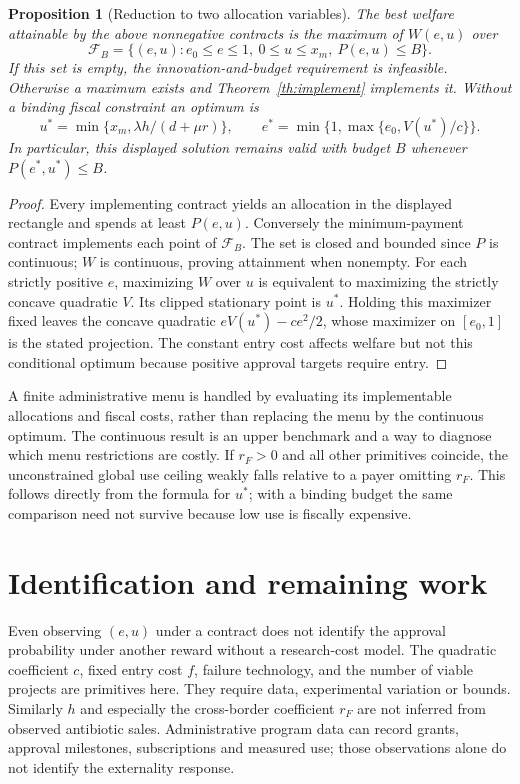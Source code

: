\documentclass[11pt,a4paper]{article}
\newtheorem{proposition}[theorem]{Proposition}
\theoremstyle{definition}
\theoremstyle{remark}
\begin{document}
\begin{proposition}[Reduction to two allocation variables]\label{pr:frontier}
The best welfare attainable by the above nonnegative contracts is the maximum of $W(e,u)$ over
\[
 \mathcal F_B=\{(e,u):e_0\leq e\leq1,\ 0\leq u\leq x_m,\ P(e,u)\leq B\}.
\]
If this set is empty, the innovation-and-budget requirement is infeasible. Otherwise a maximum exists and Theorem~\ref{th:implement} implements it. Without a binding fiscal constraint an optimum is
\[
 u^*=\min\{x_m,\lambda h/(d+\mu r)\},\qquad
 e^*=\min\{1,\max\{e_0,V(u^*)/c\}\}.
\]
In particular, this displayed solution remains valid with budget $B$ whenever $P(e^*,u^*)\leq B$.
\end{proposition}
\begin{proof}
Every implementing contract yields an allocation in the displayed rectangle and spends at least $P(e,u)$. Conversely the minimum-payment contract implements each point of $\mathcal F_B$. The set is closed and bounded since $P$ is continuous; $W$ is continuous, proving attainment when nonempty. For each strictly positive $e$, maximizing $W$ over $u$ is equivalent to maximizing the strictly concave quadratic $V$. Its clipped stationary point is $u^*$. Holding this maximizer fixed leaves the concave quadratic $eV(u^*)-ce^2/2$, whose maximizer on $[e_0,1]$ is the stated projection. The constant entry cost affects welfare but not this conditional optimum because positive approval targets require entry.
\end{proof}

A finite administrative menu is handled by evaluating its implementable allocations and fiscal costs, rather than replacing the menu by the continuous optimum. The continuous result is an upper benchmark and a way to diagnose which menu restrictions are costly. If $r_F>0$ and all other primitives coincide, the unconstrained global use ceiling weakly falls relative to a payer omitting $r_F$. This follows directly from the formula for $u^*$; with a binding budget the same comparison need not survive because low use is fiscally expensive.

\section{Identification and remaining work}
Even observing $(e,u)$ under a contract does not identify the approval probability under another reward without a research-cost model. The quadratic coefficient $c$, fixed entry cost $f$, failure technology, and the number of viable projects are primitives here. They require data, experimental variation or bounds. Similarly $h$ and especially the cross-border coefficient $r_F$ are not inferred from observed antibiotic sales. Administrative program data can record grants, approval milestones, subscriptions and measured use; those observations alone do not identify the externality response.
\end{document}
